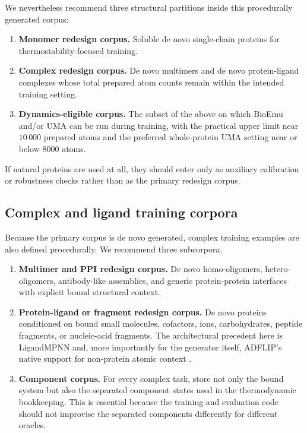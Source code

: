 \documentclass[11pt]{article}
\begin{document}
	We nevertheless recommend three structural partitions inside this procedurally generated corpus:
	\begin{enumerate}[leftmargin=1.5em]
		\item \textbf{Monomer redesign corpus.} Soluble de novo single-chain proteins for thermostability-focused training.
		\item \textbf{Complex redesign corpus.} De novo multimers and de novo protein-ligand complexes whose total prepared atom counts remain within the intended training setting.
		\item \textbf{Dynamics-eligible corpus.} The subset of the above on which BioEmu and/or UMA can be run during training, with the practical upper limit near $10\,000$ prepared atoms and the preferred whole-protein UMA setting near or below $8000$ atoms.
	\end{enumerate}
	If natural proteins are used at all, they should enter only as auxiliary calibration or robustness checks rather than as the primary redesign corpus.
	
	
	
	\subsection{Complex and ligand training corpora}
	
	Because the primary corpus is de novo generated, complex training examples are also defined procedurally. We recommend three subcorpora.
	\begin{enumerate}[leftmargin=1.5em]
		\item \textbf{Multimer and PPI redesign corpus.} De novo homo-oligomers, hetero-oligomers, antibody-like assemblies, and generic protein-protein interfaces with explicit bound structural context.
		\item \textbf{Protein-ligand or fragment redesign corpus.} De novo proteins conditioned on bound small molecules, cofactors, ions, carbohydrates, peptide fragments, or nucleic-acid fragments. The architectural precedent here is LigandMPNN and, more importantly for the generator itself, ADFLIP's native support for non-protein atomic context \citep{dauparas2025ligandmpnn,yi2025adflip}.
		\item \textbf{Component corpus.} For every complex task, store not only the bound system but also the separated component states used in the thermodynamic bookkeeping. This is essential because the training and evaluation code should not improvise the separated components differently for different oracles.
	\end{enumerate}
	
\end{document}
